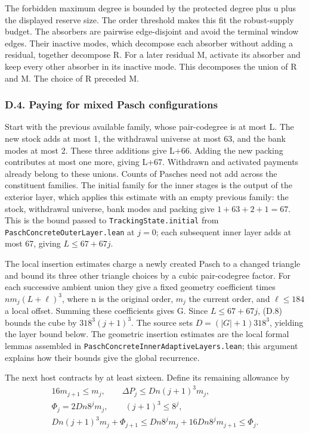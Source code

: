 \documentclass[english,11pt,a4paper]{article}
\begin{document}
The forbidden maximum degree is bounded by the protected degree plus u plus the displayed reserve size. The order threshold makes this fit the robust-supply budget. The absorbers are pairwise edge-disjoint and avoid the terminal window edges. Their inactive modes, which decompose each absorber without adding a residual, together decompose R. For a later residual M, activate its absorber and keep every other absorber in its inactive mode. This decomposes the union of R and M. The choice of R preceded M.

\subsubsection{D.4. Paying for mixed Pasch configurations}\label{d.4.-paying-for-mixed-pasch-configurations}

Start with the previous available family, whose pair-codegree is at most L. The new stock adds at most 1, the withdrawal universe at most 63, and the bank modes at most 2. These three additions give L+66. Adding the new packing contributes at most one more, giving L+67. Withdrawn and activated payments already belong to these unions. Counts of Pasches need not add across the constituent families. The initial family for the inner stages is the output of the exterior layer, which applies this estimate with an empty previous family: the stock, withdrawal universe, bank modes and packing give \(1+63+2+1=67\). This is the bound passed to \texttt{Tracking\allowbreak{}State.\allowbreak{}initial} from \texttt{Pasch\allowbreak{}Concrete\allowbreak{}Outer\allowbreak{}Layer.\allowbreak{}lean} at \(j=0\); each subsequent inner layer adds at most 67, giving \(L\leq67+67j\).

The local insertion estimates charge a newly created Pasch to a changed triangle and bound its three other triangle choices by a cubic pair-codegree factor. For each successive ambient union they give a fixed geometry coefficient times \(nm_j(L+\ell)^3\), where n is the original order, \(m_j\) the current order, and \(\ell\leq184\) a local offset. Summing these coefficients gives G. Since \(L\leq67+67j\), (D.8) bounds the cube by \(318^3(j+1)^3\). The source sets \(D=(|G|+1)318^3\), yielding the layer bound below. The geometric insertion estimates are the local formal lemmas assembled in \texttt{Pasch\allowbreak{}Concrete\allowbreak{}Inner\allowbreak{}Adaptive\allowbreak{}Layers.\allowbreak{}lean}; this argument explains how their bounds give the global recurrence.

The next host contracts by at least sixteen. Define its remaining allowance by
\[\begin{gathered}16m_{j+1}\leq m_j,\qquad \Delta P_j\leq Dn(j+1)^3m_j,\\ \Phi_j=2Dn8^jm_j,\qquad (j+1)^3\leq8^j,\\ Dn(j+1)^3m_j+\Phi_{j+1}\leq Dn8^jm_j+16Dn8^jm_{j+1}\leq\Phi_j.\end{gathered}\tag{D.7}\]
\end{document}
